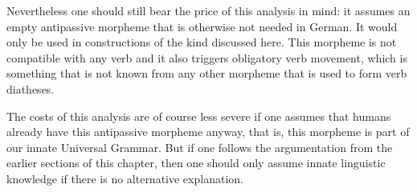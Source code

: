 \begin{exe}
\begin{xlist}[iv.]
\begin{exe}
\begin{xlist}[iv.]
\noindent
Nevertheless one should still bear the price of this analysis in mind: it assumes an empty antipassive morpheme that is otherwise not
needed in German. It would only be used in constructions of the kind discussed here. This morpheme is not compatible with
any verb and it also triggers obligatory verb movement, which is something that is not known from any other morpheme that is used
to form verb diatheses.

The costs of this analysis are of course less severe if one assumes that humans already have this antipassive morpheme anyway, that is, this morpheme
is part of our innate Universal Grammar\indexug. But if one follows the argumentation from the earlier sections of this chapter, then one should only assume
innate linguistic knowledge if there is no alternative explanation.


\end{xlist}
\end{exe}
\end{xlist}
\end{exe}
